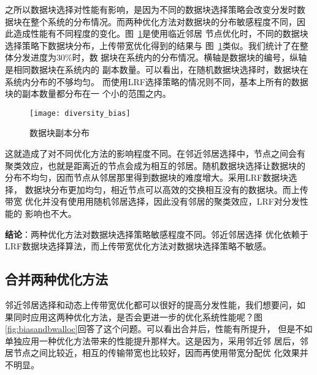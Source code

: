 之所以数据块选择对性能有影响，是因为不同的数据块选择策略会改变分发时数
据块在整个系统的分布情况。而两种优化方法对数据块的分布敏感程度不同，因
此造成性能有不同程度的变化。图~\ref{fig:diversity_bias}是使用临近邻居
节点优化时，不同的数据块选择策略下数据块分布，上传带宽优化得到的结果与
图~\ref{fig:diversity_bias}类似。我们统计了在整体分发进度为30\%时，数
据块在系统内的分布情况。横轴是数据块的编号，纵轴是相同数据块在系统内的
副本数量。可以看出，在随机数据块选择时，数据块在系统内分布的不够均匀。
而使用LRF选择策略的情况则不同，基本上所有的数据块的副本数量都分布在一
个小的范围之内。

\begin{figure}[htbp]
  \centering
  \begin{minipage}{0.6\linewidth}
    \centering
    \texttt{[image: diversity\_bias]}
    \caption{数据块副本分布}
    \label{fig:diversity_bias}
  \end{minipage}
\end{figure}


这就造成了对不同优化方法的影响程度不同。在邻近邻居选择中，节点之间会有
聚类效应，也就是距离近的节点会成为相互的邻居。随机数据块选择让数据块的
分布不均匀，因而节点从邻居那里得到数据块的难度增大。采用LRF数据块选择，
数据块分布更加均匀，相近节点可以高效的交换相互没有的数据块。而上传带宽
优化并没有使用用随机邻居选择，因此没有邻居的聚类效应，LRF对分发性能的
影响也不大。


\textbf{结论}：两种优化方法对数据块选择策略敏感程度不同。邻近邻居选择
优化依赖于LRF数据块选择算法，而上传带宽优化方法对数据块选择策略不敏感。


\subsection{合并两种优化方法}

邻近邻居选择和动态上传带宽优化都可以很好的提高分发性能，我们想要问，如
果同时应用这两种优化方法，是否会更进一步的优化系统性能呢？图~
\ref{fig:biasandbwalloc}回答了这个问题。可以看出合并后，性能有所提升，
但是不如单独应用一种优化方法带来的性能提升那样大。这是因为，采用邻近邻
居后，邻居节点之间比较近，相互的传输带宽也比较好，因而再使用带宽分配优
化效果并不明显。

